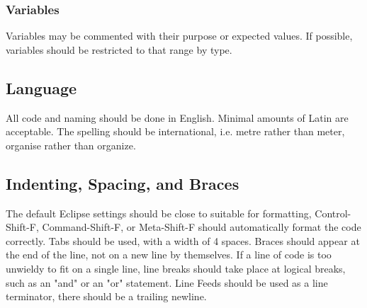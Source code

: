 \documentclass[]{report}
\begin{document}
\subsubsection{Variables}
Variables may be commented with their purpose or expected values.
If possible, variables should be restricted to that range by type.

\subsection{Language}
All code and naming should be done in English.
Minimal amounts of Latin are acceptable.
The spelling should be international, i.e. metre rather than meter, organise rather than organize.

\subsection{Indenting, Spacing, and Braces}
The default Eclipse settings should be close to suitable for formatting, Control-Shift-F, Command-Shift-F, or Meta-Shift-F should automatically format the code correctly.
Tabs should be used, with a width of 4 spaces.
Braces should appear at the end of the line, not on a new line by themselves.
If a line of code is too unwieldy to fit on a single line, line breaks should take place at logical breaks, such as an "and" or an "or" statement.
Line Feeds should be used as a line terminator, there should be a trailing newline.
\end{document}
